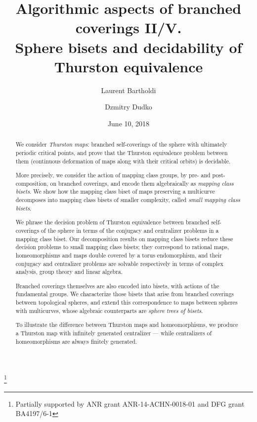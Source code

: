 \documentclass{amsart}
\begin{document}
\title[Sphere bisets and decidability of Thurston equivalence]{Algorithmic aspects of branched coverings II/V.\\ Sphere bisets and decidability of Thurston equivalence}
\author{Laurent Bartholdi}
\author{Dzmitry Dudko}
\address{\'Ecole Normale Sup\'erieure, Paris \emph{and} Mathematisches Institut, Georg-August Universit\"at zu G\"ottingen}
\thanks{Partially supported by ANR grant ANR-14-ACHN-0018-01 and DFG grant BA4197/6-1}
\date{June 10, 2018}
\begin{abstract}
  We consider \emph{Thurston maps}: branched self-coverings of the
  sphere with ultimately periodic critical points, and prove that the
  Thurston equivalence problem between them (continuous deformation of
  maps along with their critical orbits) is decidable.

  More precisely, we consider the action of mapping class groups, by
  pre- and post-composition, on branched coverings, and encode them
  algebraically as \emph{mapping class bisets}.  We show how the
  mapping class biset of maps preserving a multicurve decomposes into
  mapping class bisets of smaller complexity, called \emph{small
    mapping class bisets}.

  We phrase the decision problem of Thurston equivalence between
  branched self-coverings of the sphere in terms of the conjugacy and
  centralizer problems in a mapping class biset.  Our decomposition
  results on mapping class bisets reduce these decision problems to
  small mapping class bisets; they correspond to rational maps,
  homeomorphisms and maps double covered by a torus endomorphism, and
  their conjugacy and centralizer problems are solvable respectively
  in terms of complex analysis, group theory and linear algebra.

  Branched coverings themselves are also encoded into bisets, with
  actions of the fundamental groups. We characterize those bisets that
  arise from branched coverings between topological spheres, and
  extend this correspondence to maps between spheres with multicurves,
  whose algebraic counterparts are \emph{sphere trees of bisets}.

  To illustrate the difference between Thurston maps and
  homeomorphisms, we produce a Thurston map with infinitely generated
  centralizer --- while centralizers of homeomorphisms are always
  finitely generated.
\end{abstract}
\maketitle
\end{document}
